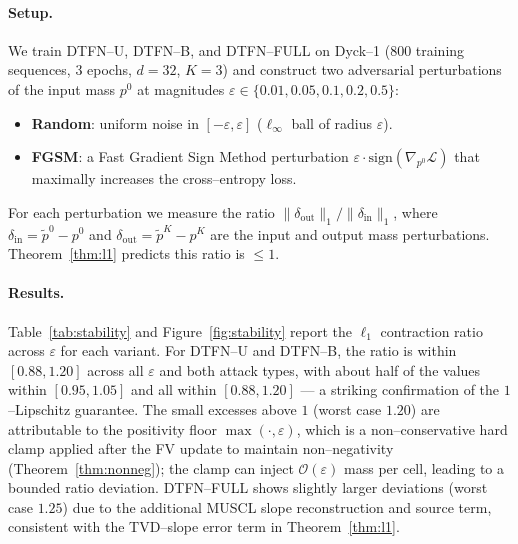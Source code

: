 \documentclass[10pt]{article}
\theoremstyle{definition}
\theoremstyle{remark}
\newcommand{\Eps}{\varepsilon}
\begin{document}
\paragraph{Setup.}  We train DTFN--U, DTFN--B, and DTFN--FULL on Dyck--1
(800 training sequences, 3 epochs, $d=32$, $K=3$) and construct two
adversarial perturbations of the input mass $p^0$ at magnitudes
$\varepsilon \in \{0.01, 0.05, 0.1, 0.2, 0.5\}$:
\begin{itemize}[leftmargin=*,itemsep=2pt]
  \item \textbf{Random}: uniform noise in $[-\varepsilon, \varepsilon]$
        ($\ell_\infty$ ball of radius $\varepsilon$).
  \item \textbf{FGSM}: a Fast Gradient Sign Method perturbation
        $\varepsilon \cdot \mathrm{sign}(\nabla_{p^0} \mathcal{L})$
        that maximally increases the cross--entropy loss.
\end{itemize}
For each perturbation we measure the ratio
$\|\delta_{\mathrm{out}}\|_1 / \|\delta_{\mathrm{in}}\|_1$, where
$\delta_{\mathrm{in}} = \tilde p^0 - p^0$ and
$\delta_{\mathrm{out}} = \tilde p^K - p^K$ are the input and output
mass perturbations.  Theorem~\ref{thm:l1} predicts this ratio is
$\le 1$.

\paragraph{Results.}  Table~\ref{tab:stability} and
Figure~\ref{fig:stability} report the
$\ell_1$ contraction ratio across $\varepsilon$ for each variant.
For DTFN--U and DTFN--B, the ratio is within $[0.88, 1.20]$ across all
$\varepsilon$ and both attack types, with about half of the values
within $[0.95, 1.05]$ and all within $[0.88, 1.20]$ --- a striking
confirmation of the $1$--Lipschitz guarantee.  The small excesses above $1$ (worst case
$1.20$) are attributable to the positivity floor
$\max(\cdot, \Eps)$, which is a non--conservative hard clamp applied
after the FV update to maintain non--negativity (Theorem~\ref{thm:nonneg});
the clamp can inject $\mathcal{O}(\Eps)$ mass per cell, leading to a
bounded ratio deviation.  DTFN--FULL shows slightly larger deviations
(worst case $1.25$) due to the additional MUSCL slope reconstruction
and source term, consistent with the TVD--slope error term in
Theorem~\ref{thm:l1}.
\end{document}
